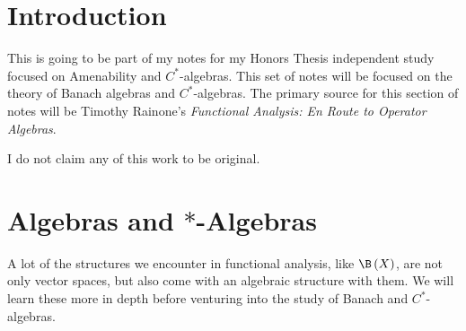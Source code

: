 \documentclass[10pt]{mypackage}
\begin{document}
\RaggedRight
\tableofcontents
\section{Introduction}%
This is going to be part of my notes for my Honors Thesis independent study focused on Amenability and $C^{\ast}$-algebras. This set of notes will be focused on the theory of Banach algebras and $C^{\ast}$-algebras. The primary source for this section of notes will be Timothy Rainone's \textit{Functional Analysis: En Route to Operator Algebras}.\newline

I do not claim any of this work to be original.
\section{Algebras and $\ast$-Algebras}%
A lot of the structures we encounter in functional analysis, like $\B\left(X\right)$, are not only vector spaces, but also come with an algebraic structure with them. We will learn these more in depth before venturing into the study of Banach and $C^{\ast}$-algebras.
\end{document}

